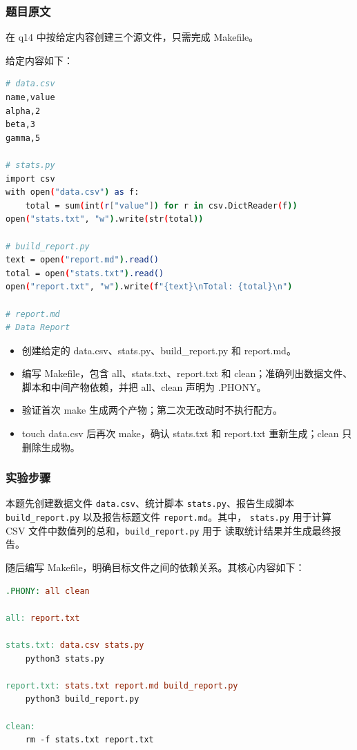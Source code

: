 \documentclass[12pt,a4paper]{ctexart}
\begin{document}
\subsubsection*{题目原文}

在 q14 中按给定内容创建三个源文件，只需完成 Makefile。

给定内容如下：

\begin{lstlisting}[language=bash]
# data.csv
name,value
alpha,2
beta,3
gamma,5

# stats.py
import csv
with open("data.csv") as f:
    total = sum(int(r["value"]) for r in csv.DictReader(f))
open("stats.txt", "w").write(str(total))

# build_report.py
text = open("report.md").read()
total = open("stats.txt").read()
open("report.txt", "w").write(f"{text}\nTotal: {total}\n")

# report.md
# Data Report
\end{lstlisting}

\begin{itemize}
  \item 创建给定的 data.csv、stats.py、build\_report.py 和 report.md。
  \item 编写 Makefile，包含 all、stats.txt、report.txt 和 clean；准确列出数据文件、脚本和中间产物依赖，并把 all、clean 声明为 .PHONY。
  \item 验证首次 make 生成两个产物；第二次无改动时不执行配方。
  \item touch data.csv 后再次 make，确认 stats.txt 和 report.txt 重新生成；clean 只删除生成物。
\end{itemize}

\subsubsection*{实验步骤}

本题先创建数据文件 \verb|data.csv|、统计脚本 \verb|stats.py|、报告生成脚本
\verb|build_report.py| 以及报告标题文件 \verb|report.md|。其中，
\verb|stats.py| 用于计算 CSV 文件中数值列的总和，\verb|build_report.py| 用于
读取统计结果并生成最终报告。

随后编写 Makefile，明确目标文件之间的依赖关系。其核心内容如下：

\begin{lstlisting}[language=make]
.PHONY: all clean

all: report.txt

stats.txt: data.csv stats.py
	python3 stats.py

report.txt: stats.txt report.md build_report.py
	python3 build_report.py

clean:
	rm -f stats.txt report.txt
\end{lstlisting}
\end{document}
